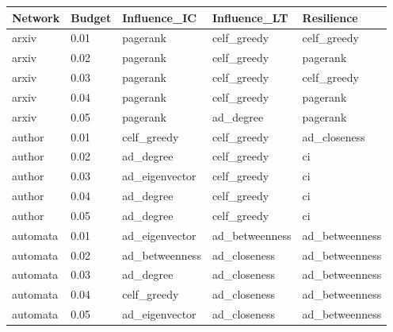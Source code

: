\begin{longtable}[c]{|l|l|l|l|l|}
	\hline
	\textbf{Network} & \textbf{Budget} & \textbf{Influence\_IC} & \textbf{Influence\_LT} & \textbf{Resilience} \\ \hline
	\endfirsthead
	\endhead
	arxiv            & 0.01            & pagerank               & celf\_greedy           & celf\_greedy        \\ \hline
	arxiv            & 0.02            & pagerank               & celf\_greedy           & pagerank            \\ \hline
	arxiv            & 0.03            & pagerank               & celf\_greedy           & celf\_greedy        \\ \hline
	arxiv            & 0.04            & pagerank               & celf\_greedy           & pagerank            \\ \hline
	arxiv            & 0.05            & pagerank               & ad\_degree             & pagerank            \\ \hline
	author           & 0.01            & celf\_greedy           & celf\_greedy           & ad\_closeness       \\ \hline
	author           & 0.02            & ad\_degree             & celf\_greedy           & ci                  \\ \hline
	author           & 0.03            & ad\_eigenvector        & celf\_greedy           & ci                  \\ \hline
	author           & 0.04            & ad\_degree             & celf\_greedy           & ci                  \\ \hline
	author           & 0.05            & ad\_degree             & celf\_greedy           & ci                  \\ \hline
	automata         & 0.01            & ad\_eigenvector        & ad\_betweenness        & ad\_betweenness     \\ \hline
	automata         & 0.02            & ad\_betweenness        & ad\_closeness          & ad\_betweenness     \\ \hline
	automata         & 0.03            & ad\_degree             & ad\_closeness          & ad\_betweenness     \\ \hline
	automata         & 0.04            & celf\_greedy           & ad\_closeness          & ad\_betweenness     \\ \hline
	automata         & 0.05            & ad\_eigenvector        & ad\_closeness          & ad\_betweenness     \\ \hline

\end{longtable}
